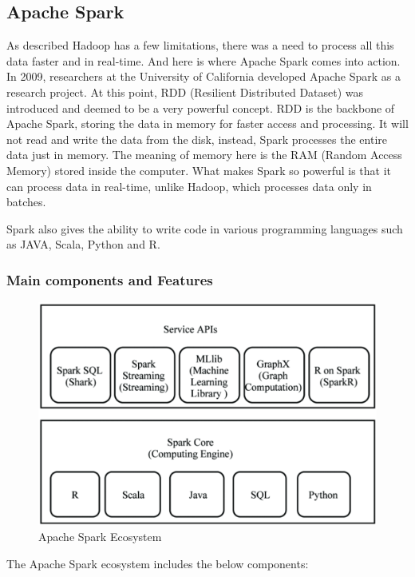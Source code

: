 \subsection{Apache Spark}
As described Hadoop has a few limitations, there was a need to process all this data faster and in real-time. And here is where Apache Spark comes into action. In 2009, researchers at the University of California developed Apache Spark as a research project. At this point, RDD (Resilient Distributed Dataset) was introduced and deemed to be a very powerful concept.\cite{apache-spark}
RDD is the backbone of Apache Spark, storing the data in memory for faster access and processing. It will not read and write the data from the disk, instead, Spark processes the entire data just in memory. The meaning of memory here is the RAM (Random Access Memory) stored inside the computer. 
What makes Spark so powerful is that it can process data in real-time, unlike Hadoop, which processes data only in batches.

Spark also gives the ability to write code in various programming languages such as JAVA, Scala, Python and R.

\subsubsection{Main components and Features}

\begin{figure}[ht]
    \centering
    \includegraphics[width=1\linewidth]{images/Spark_Eco.png}
    \caption{Apache Spark Ecosystem}
    \label{fig:spark-eco}
\end{figure}


The Apache Spark ecosystem includes the below components\cite{8988541}:

